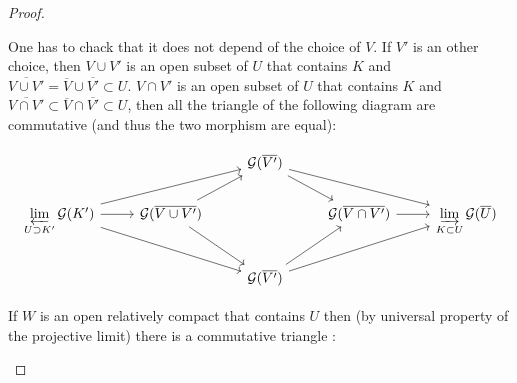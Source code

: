 \begin{proof}
\begin{itemize}
        One has to chack that it does not depend of the choice of $V$. If $V'$ is an other choice, then $V\cup V'$ is an open subset of $U$ that contains $K$ and $\overline{V\cup V'}=\overline{V}\cup\overline{V'}\subset U$. $V\cap V'$ is an open subset of $U$ that contains $K$ and $\overline{V\cap V'}\subset \overline{V}\cap\overline{V'}\subset U$, then all the triangle of the following diagram are commutative (and thus the two morphism are equal):

\[\begin{tikzcd}
	&& {\mathcal{G}(\overline{V'})} \\
	{\varprojlim\limits_{U\supset K'}\mathcal{G}(K')} & {\mathcal{G}(\overline{V\cup V'})} && {\mathcal{G}(\overline{V\cap V'})} & {\varinjlim\limits_{K\subset U}\mathcal{G}(\overline{U})} \\
	&& {\mathcal{G}(\overline{V'})}
	\arrow[from=1-3, to=2-4]
	\arrow[from=1-3, to=2-5]
	\arrow[from=2-1, to=1-3]
	\arrow[from=2-1, to=2-2]
	\arrow[from=2-1, to=3-3]
	\arrow[from=2-2, to=1-3]
	\arrow[from=2-2, to=3-3]
	\arrow[from=2-4, to=2-5]
	\arrow[from=3-3, to=2-4]
	\arrow[from=3-3, to=2-5]
\end{tikzcd}\]

    If $W$ is an open relatively compact that contains $U$ then (by universal property of the projective limit) there is a commutative triangle :


\end{itemize}
\end{proof}
